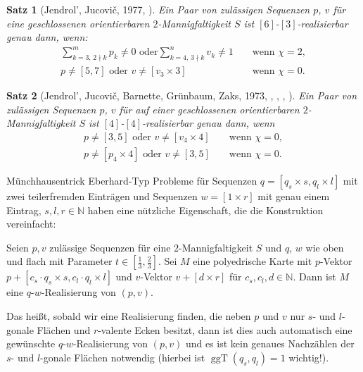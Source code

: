 \documentclass[10pt, notheorems]{beamer}
\newtheorem{theorem}{Satz}[section]
\newcommand{\nats}{\mathbb{N}}
\renewcommand{\gcd}{\operatorname{ggT}}
\begin{document}
\begin{frame}
  \begin{theorem}[{\sc Jendrol', Jucovi{\v{c}}}, 1977, \cite{jendrol1977generalization}] \label{thm:eberhard:extended:3}
    Ein Paar von zulässigen Sequenzen $p$, $v$ für eine geschlossenen orientierbaren $2$-Mannigfaltigkeit $S$ ist $[6]$-$[3]$-realisierbar genau dann, wenn:
    \begin{align*}
      \sum_{k=3,\,2 \nmid k}^{m} p_k \neq 0 \text{ oder} \sum_{k=4,\,3 \nmid k}^n v_k \neq 1& &\text{ wenn } \chi = 2, \\
      p \neq [5, 7] \text{ oder } v \neq [v_3 \times 3]& &\text{ wenn } \chi = 0.
    \end{align*}
  \end{theorem}
  \pause
  \begin{theorem}[{\sc Jendrol', Jucovi{\v{c}}, Barnette, Grünbaum, Zaks}, 1973, \cite{jucovivc1973theorem}, \cite{barnette1971toroidal}, \cite{grunbaum1969planar}, \cite{zaks1971analogue}] \label{thm:eberhard:extended:4}
    Ein Paar von zulässigen Sequenzen $p$, $v$ für auf einer geschlossenen orientierbaren $2$-Mannigfaltigkeit $S$ ist $[4]$-$[4]$-realisierbar genau dann, wenn
    \begin{align*}
      p \neq [3, 5] \text{ oder } v \neq [v_4 \times 4]& &\text{ wenn } \chi = 0,\\
      p \neq [p_4 \times 4] \text{ oder } v \neq [3, 5]& &\text{ wenn } \chi = 0.
    \end{align*}
  \end{theorem}
\end{frame}


\begin{frame}{Münchhausentrick}{}
  {\sc Eberhard}-Typ Probleme für Sequenzen $q = [q_s \times s, q_l \times l]$ mit zwei teilerfremden Einträgen und Sequenzen $w = [1 \times r]$ mit genau einem Eintrag, $s, l, r \in \nats$ haben eine nützliche Eigenschaft, die die Konstruktion vereinfacht:
  \begin{lemma}
    Seien $p, v$ zulässige Sequenzen für eine $2$-Mannigfaltigkeit $S$ und $q$, $w$ wie oben und flach mit Parameter $t \in \left[\tfrac{1}{3}, \tfrac{2}{3}\right]$. Sei $M$ eine polyedrische Karte mit $p$-Vektor $p + [c_s \cdot q_s \times s, c_l \cdot q_l \times l]$ und $v$-Vektor $v + [d \times r]$ für $c_s, c_l, d \in \nats$. Dann ist $M$ eine $q$-$w$-Realisierung von $(p, v)$.
  \end{lemma}
  \pause
  Das heißt, sobald wir eine Realisierung finden, die neben $p$ und $v$ nur $s$- und $l$-gonale Flächen und $r$-valente Ecken besitzt, dann ist dies auch automatisch eine gewünschte $q$-$w$-Realisierung von $(p, v)$ und es ist kein genaues Nachzählen der \newline $s$- und $l$-gonale Flächen notwendig (hierbei ist $\gcd(q_s, q_l) = 1$ wichtig!).
\end{frame}
\end{document}
